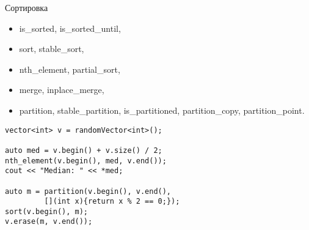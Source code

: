 \documentclass[aspectration=1610,t]{beamer}
\begin{document}

%


\begin{frame}[fragile]{Сортировка}
\begin{itemize}
    \tt
    \item is\_sorted, is\_sorted\_until,
    \item sort, stable\_sort,
    \item nth\_element, partial\_sort,
    \item merge, inplace\_merge,
    \item partition, stable\_partition, is\_partitioned, partition\_copy, partition\_point.
\end{itemize}
\pause
\begin{lstlisting}
vector<int> v = randomVector<int>();

auto med = v.begin() + v.size() / 2;
nth_element(v.begin(), med, v.end());
cout << "Median: " << *med;

auto m = partition(v.begin(), v.end(),
         [](int x){return x % 2 == 0;});
sort(v.begin(), m);
v.erase(m, v.end());        
\end{lstlisting}
\end{frame}
\end{document}
